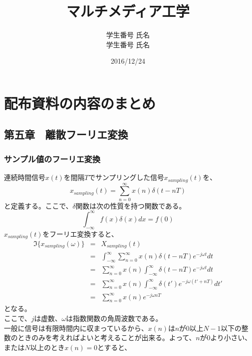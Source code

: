 \documentclass[a4paper]{jsarticle}
\title{マルチメディア工学}
\author{学生番号 氏名 \\ 学生番号 氏名}
\date{2016/12/24}
\begin{document}
\maketitle
\section{配布資料の内容のまとめ}
\subsection{第五章　離散フーリエ変換}
\subsubsection{サンプル値のフーリエ変換}
連続時間信号$x\left(t\right)$を間隔$T$でサンプリングした信号$x_{sampling} \left( t \right)$を、
\begin{equation}
x_{sampling} \left( t \right) = \sum_{n=0}^{ \infty } x \left( n\right) \delta \left( t-nT \right)
\end{equation}
と定義する。ここで、$\delta$関数は次の性質を持つ関数である。
\begin{equation}
\int_{- \infty }^{ \infty } f \left( x \right) \delta \left( x \right) dx = f \left( 0 \right)
\end{equation}
$x_{sampling} \left( t \right)$をフーリエ変換すると、
\begin{eqnarray}
	\mathfrak{I} \bigl\{ x_{sampling} \left( \omega \right) \bigr\} &=& X_{sampling} \left( t \right) \nonumber \\
	&=& \int _{ - \infty } ^{ \infty } \sum _{ n = 0 } ^{ \infty } x \left( n \right) \delta \left( t-nT \right) e ^ { -j \omega t } dt \nonumber \\
	&=& \sum _{ n = 0 } ^{ \infty } x \left( n \right) \int_{- \infty } ^{ \infty} \delta \left( t-nT \right) e ^{ -j \omega t } dt \nonumber \\
	&=& \sum _{ n = 0 } ^{ \infty } x \left( n \right) \int_{- \infty } ^{ \infty} \delta \left( t' \right) e ^{ -j \omega \left( t' + nT \right) } dt' \nonumber \\
	&=& \sum _{ n = 0 } ^{ \infty } x \left( n \right) e ^ { -j \omega nT }
\end{eqnarray}
となる。\\
ここで、$j$は虚数、$\omega$は指数関数の角周波数である。\\
一般に信号は有限時間内に収まっているから、$x \left( n \right)$は$n$が$0$以上$N-1$以下の整数のときのみを考えればよいと考えることが出来る。よって、$n$が$0$より小さい、または$N$以上のとき$x \left( n \right) = 0$とすると、
\end{document}
